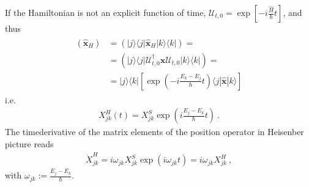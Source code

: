 \documentclass[letterpaper,10pt,english]{jupyterBook}
\begin{document}
\sphinxAtStartPar
If the Hamiltonian is not an explicit function of time, \(\mathscr{U}_{t,0} = \exp\left[ -i \frac{\hat{H}}{\hbar} t \right]\), and thus
\begin{equation*}
\begin{split}\begin{aligned}
  \left( \hat{\mathbf{x}}_H  \right)
  & = \left( | j \rangle \langle j | \hat{\mathbf{x}}_H | k \rangle \langle k | \right) = \\
  & = \left( | j \rangle \langle j | \mathscr{U}_{t,0}^{\dagger} \hat{\mathbf{x}} \mathscr{U}_{t,0} | k \rangle \langle k | \right) = \\
  & = | j \rangle \langle k | \left[ \exp\left(- i \frac{E_k-E_j}{\hbar} t  \right) \langle j | \hat{\mathbf{x}} | k \rangle  \right] 
\end{aligned}\end{split}
\end{equation*}
\sphinxAtStartPar
i.e.
\begin{equation*}
\begin{split}X^{H}_{jk}(t) = X^{S}_{jk} \exp\left( i \frac{E_j - E_k}{\hbar} t \right) \ .\end{split}
\end{equation*}
\sphinxAtStartPar
The time\sphinxhyphen{}derivative of the matrix elements of the position operator in Heisenber picture reads
\begin{equation*}
\begin{split}\dot{X}^{H}_{jk} = i \omega_{jk} X^{S}_{jk} \exp\left( i \omega_{jk} t \right) = i \omega_{jk} X^H_{jk} \ ,\end{split}
\end{equation*}
\sphinxAtStartPar
with \(\omega_{jk} := \frac{E_j - E_k}{\hbar}\).
\end{document}

